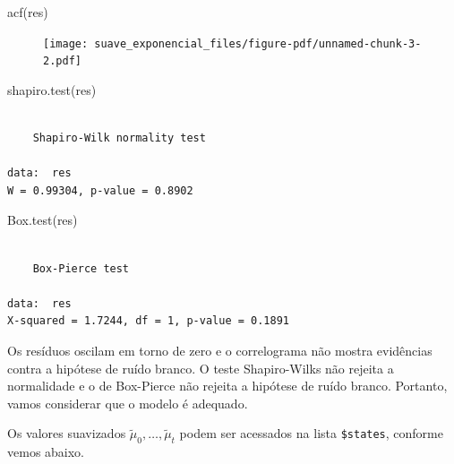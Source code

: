\documentclass[
  letterpaper,
  DIV=11,
  numbers=noendperiod]{scrartcl}
\newenvironment{Shaded}{\begin{snugshade}}{\end{snugshade}}
\newcommand{\AttributeTok}[1]{\textcolor[rgb]{0.40,0.45,0.13}{#1}}
\newcommand{\DecValTok}[1]{\textcolor[rgb]{0.68,0.00,0.00}{#1}}
\newcommand{\FunctionTok}[1]{\textcolor[rgb]{0.28,0.35,0.67}{#1}}
\newcommand{\NormalTok}[1]{\textcolor[rgb]{0.00,0.23,0.31}{#1}}
\newcommand{\SpecialCharTok}[1]{\textcolor[rgb]{0.37,0.37,0.37}{#1}}
\newcommand{\StringTok}[1]{\textcolor[rgb]{0.13,0.47,0.30}{#1}}
\theoremstyle{plain}
\theoremstyle{plain}
\theoremstyle{definition}
\theoremstyle{definition}
\theoremstyle{remark}
\begin{document}
\begin{Shaded}
\begin{Highlighting}[]
\FunctionTok{acf}\NormalTok{(res)}
\end{Highlighting}
\end{Shaded}

\begin{figure}[H]

{\centering \texttt{[image: suave\_exponencial\_files/figure-pdf/unnamed-chunk-3-2.pdf]}

}

\end{figure}

\begin{Shaded}
\begin{Highlighting}[]
\FunctionTok{shapiro.test}\NormalTok{(res)}
\end{Highlighting}
\end{Shaded}

\begin{verbatim}

    Shapiro-Wilk normality test

data:  res
W = 0.99304, p-value = 0.8902
\end{verbatim}

\begin{Shaded}
\begin{Highlighting}[]
\FunctionTok{Box.test}\NormalTok{(res)}
\end{Highlighting}
\end{Shaded}

\begin{verbatim}

    Box-Pierce test

data:  res
X-squared = 1.7244, df = 1, p-value = 0.1891
\end{verbatim}

Os resíduos oscilam em torno de zero e o correlograma não mostra
evidências contra a hipótese de ruído branco. O teste Shapiro-Wilks não
rejeita a normalidade e o de Box-Pierce não rejeita a hipótese de ruído
branco. Portanto, vamos considerar que o modelo é adequado.

Os valores suavizados \(\tilde{\mu}_0,\ldots,\tilde{\mu}_t\) podem ser
acessados na lista \texttt{\$states}, conforme vemos abaixo.

\begin{Shaded}
\end{Shaded}
\end{document}
